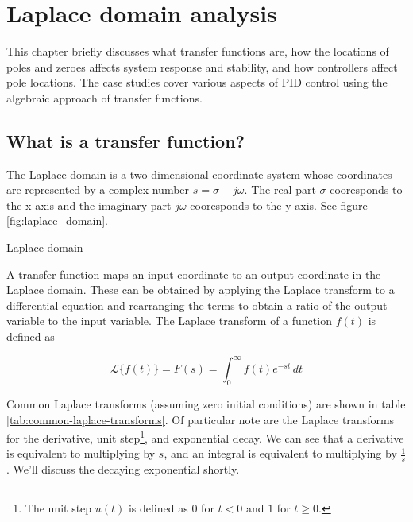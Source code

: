 
\chapter{Laplace domain analysis}

This chapter briefly discusses what transfer functions are, how the locations of
poles and zeroes affects system response and stability, and how controllers
affect pole locations. The case studies cover various aspects of PID control
using the algebraic approach of transfer functions.

\section{What is a transfer function?}

The Laplace domain is a two-dimensional coordinate system whose coordinates are
represented by a complex number $s = \sigma + j\omega$. The real part $\sigma$
cooresponds to the x-axis and the imaginary part $j\omega$ cooresponds to the
y-axis. See figure \ref{fig:laplace_domain}.

\begin{bookfigure}

  \caption{Laplace domain}
  \label{fig:laplace_domain}
\end{bookfigure}

A transfer function maps an input coordinate to an output coordinate in the
Laplace domain. These can be obtained by applying the Laplace transform to a
differential equation and rearranging the terms to obtain a ratio of the output
variable to the input variable. The Laplace transform of a function $f(t)$ is
defined as

\begin{equation*}
  \mathcal{L}\{f(t)\} = F(s) = \int_0^\infty f(t) e^{-st} \,dt
\end{equation*}

Common Laplace transforms (assuming zero initial conditions) are shown in table
\ref{tab:common-laplace-transforms}. Of particular note are the Laplace
transforms for the derivative, unit step\footnote{The unit step $u(t)$ is
defined as $0$ for $t < 0$ and $1$ for $t \ge 0$.}, and exponential decay. We
can see that a derivative is equivalent to multiplying by $s$, and an integral
is equivalent to multiplying by $\frac{1}{s}$. We'll discuss the decaying
exponential shortly.

